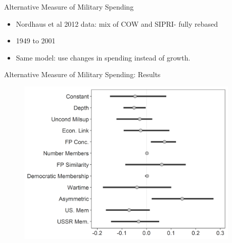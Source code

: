 \documentclass[12pt]{beamer}
\begin{document}

\begin{frame}{Alternative Measure of Military Spending}


\begin{itemize} 
\item Nordhaus et al 2012 data: mix of COW and SIPRI- fully rebased
\item 1949 to 2001
\item Same model: use changes in spending instead of growth. 
\end{itemize}

\end{frame}



\begin{frame}{Alternative Measure of Military Spending: Results}

\begin{figure}[htbp]
	\centering
		\includegraphics[width=0.95\textwidth]{beta-intervals-post45.png}
\end{figure}

\end{frame}

\end{document}
